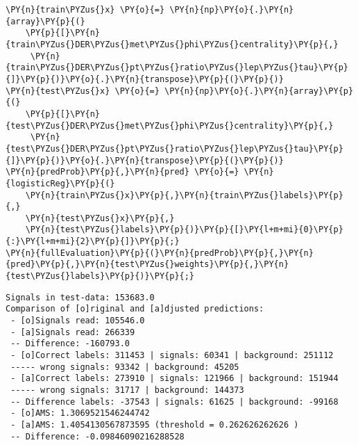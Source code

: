 {\par%
\vspace{-1\baselineskip}%
}%
\begin{notebookcell}[]%
\begin{addmargin}[\cellleftmargin]{0em}%
{\smaller%
\par%
%
\vspace{-1\smallerfontscale}%
\begin{Verbatim}[commandchars=\\\{\}]
\PY{n}{train\PYZus{}x} \PY{o}{=} \PY{n}{np}\PY{o}{.}\PY{n}{array}\PY{p}{(}
    \PY{p}{[}\PY{n}{train\PYZus{}DER\PYZus{}met\PYZus{}phi\PYZus{}centrality}\PY{p}{,}
     \PY{n}{train\PYZus{}DER\PYZus{}pt\PYZus{}ratio\PYZus{}lep\PYZus{}tau}\PY{p}{]}\PY{p}{)}\PY{o}{.}\PY{n}{transpose}\PY{p}{(}\PY{p}{)}
\PY{n}{test\PYZus{}x} \PY{o}{=} \PY{n}{np}\PY{o}{.}\PY{n}{array}\PY{p}{(}
    \PY{p}{[}\PY{n}{test\PYZus{}DER\PYZus{}met\PYZus{}phi\PYZus{}centrality}\PY{p}{,}
     \PY{n}{test\PYZus{}DER\PYZus{}pt\PYZus{}ratio\PYZus{}lep\PYZus{}tau}\PY{p}{]}\PY{p}{)}\PY{o}{.}\PY{n}{transpose}\PY{p}{(}\PY{p}{)}
\PY{n}{predProb}\PY{p}{,}\PY{n}{pred} \PY{o}{=} \PY{n}{logisticReg}\PY{p}{(}
    \PY{n}{train\PYZus{}x}\PY{p}{,}\PY{n}{train\PYZus{}labels}\PY{p}{,}
    \PY{n}{test\PYZus{}x}\PY{p}{,}
    \PY{n}{test\PYZus{}labels}\PY{p}{)}\PY{p}{[}\PY{l+m+mi}{0}\PY{p}{:}\PY{l+m+mi}{2}\PY{p}{]}\PY{p}{;}
\PY{n}{fullEvaluation}\PY{p}{(}\PY{n}{predProb}\PY{p}{,}\PY{n}{pred}\PY{p}{,}\PY{n}{test\PYZus{}weights}\PY{p}{,}\PY{n}{test\PYZus{}labels}\PY{p}{)}\PY{p}{;}
\end{Verbatim}
%
\par%
\vspace{-1\smallerfontscale}}%
\end{addmargin}
\end{notebookcell}

\par\vspace{1\smallerfontscale}%
    \begin{addmargin}[\cellleftmargin]{0em}%
    {\smaller%
    \vspace{-1\smallerfontscale}%
    
    \begin{Verbatim}[commandchars=\\\{\}]
Signals in test-data: 153683.0
Comparison of [o]riginal and [a]djusted predictions:
 - [o]Signals read: 105546.0 
 - [a]Signals read: 266339 
 -- Difference: -160793.0 
 - [o]Correct labels: 311453 | signals: 60341 | background: 251112 
 ----- wrong signals: 93342 | background: 45205 
 - [a]Correct labels: 273910 | signals: 121966 | background: 151944 
 ----- wrong signals: 31717 | background: 144373 
 -- Difference labels: -37543 | signals: 61625 | background: -99168 
 - [o]AMS: 1.3069521546244742 
 - [a]AMS: 1.4054130567873595 (threshold = 0.262626262626 )
 -- Difference: -0.09846090216288528
    \end{Verbatim}
}%
    \end{addmargin}%